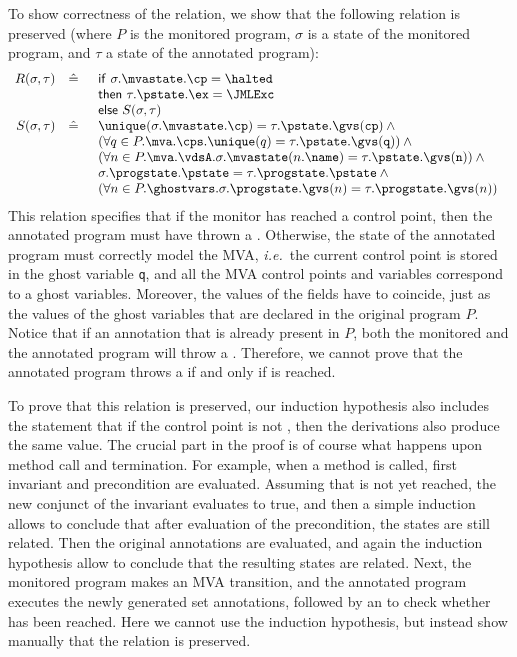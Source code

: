 To show correctness of the relation, we show that the following
relation is preserved (where \(P\) is the monitored program,
\(\sigma\) is a state of the monitored program, and \(\tau\) a state
of the annotated program):
\[
\begin{array}{rcl}
R(\sigma, \tau) & \hat=  &
\begin{array}[t]{l}
\mathsf{if\ }\sigma.\mvastate.\cp = \halted\\
\mathsf{then\ }\tau.\pstate.\ex = \JMLExc\\
\mathsf{else\ }S(\sigma, \tau)
\end{array}\\
S(\sigma, \tau) & \hat= &
\begin{array}[t]{l}
\unique(\sigma.\mvastate.\cp) = \tau.\pstate.\gvs(\texttt{cp}) \:\wedge\\
(\forall q \in P.\mva.\cps. \unique(q) =
\tau.\pstate.\gvs(\texttt{q})) \:\wedge\\
(\forall n \in P.\mva.\vdsA. \sigma.\mvastate(n.\name) =
                             \tau.\pstate.\gvs(\texttt{n})) \:\wedge\\
\sigma.\progstate.\pstate = \tau.\progstate.\pstate \:\wedge\\
(\forall n \in P.\ghostvars. \sigma.\progstate.\gvs(n) =
\tau.\progstate.\gvs(n))
\end{array}
\end{array}
\]
This relation specifies that if the monitor has reached a \halted
control point, then the annotated program must have thrown a
\JMLExc. Otherwise, the state of the annotated program must correctly
model the MVA, \emph{i.e.}\ the current control point is stored in the
ghost variable \texttt{q}, and all the MVA control points and
variables correspond to a ghost variables. Moreover, the values of the
fields have to coincide, just as the values of the ghost variables
that are declared in the original program \(P\). Notice that if an
annotation that is already present in \(P\), both the monitored and
the annotated program will throw a \JMLExc. Therefore, we cannot prove
that the annotated program throws a \JMLExc if and only if \halted is
reached.

To prove that this relation is preserved, our induction hypothesis
also includes the statement that if the control point is not \halted,
then the derivations also produce the same value. The crucial part in
the proof is of course what happens upon method call and
termination. For example, when a method is called, first invariant and
precondition are evaluated. Assuming that \halted is not yet reached,
the new conjunct of the invariant evaluates to true, and then a simple
induction allows to conclude that after evaluation of the
precondition, the states are still related. Then the original \preset
annotations are evaluated, and again the induction hypothesis allow to
conclude that the resulting states are related. Next, the monitored
program makes an MVA transition, and the annotated program executes
the newly generated set annotations, followed by an \Assert to check
whether \halted has been reached. Here we cannot use the induction
hypothesis, but instead show manually that the relation is preserved.


